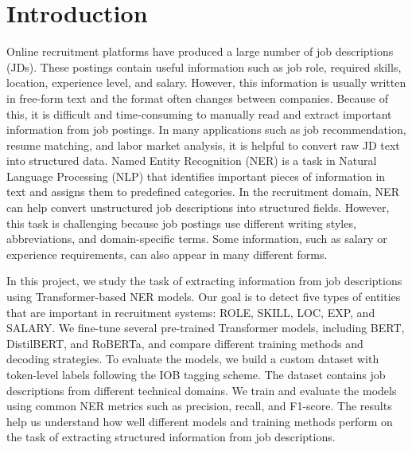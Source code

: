 \section{Introduction}

Online recruitment platforms have produced a large number of job descriptions (JDs). These postings contain useful information such as job role, required skills, location, experience level, and salary. However, this information is usually written in free-form text and the format often changes between companies. Because of this, it is difficult and time-consuming to manually read and extract important information from job postings. In many applications such as job recommendation, resume matching, and labor market analysis, it is helpful to convert raw JD text into structured data. Named Entity Recognition (NER) is a task in Natural Language Processing (NLP) that identifies important pieces of information in text and assigns them to predefined categories. In the recruitment domain, NER can help convert unstructured job descriptions into structured fields. However, this task is challenging because job postings use different writing styles, abbreviations, and domain-specific terms. Some information, such as salary or experience requirements, can also appear in many different forms.

In this project, we study the task of extracting information from job descriptions using Transformer-based NER models. Our goal is to detect five types of entities that are important in recruitment systems: ROLE, SKILL, LOC, EXP, and SALARY. We fine-tune several pre-trained Transformer models, including BERT, DistilBERT, and RoBERTa, and compare different training methods and decoding strategies. To evaluate the models, we build a custom dataset with token-level labels following the IOB tagging scheme. The dataset contains job descriptions from different technical domains. We train and evaluate the models using common NER metrics such as precision, recall, and F1-score. The results help us understand how well different models and training methods perform on the task of extracting structured information from job descriptions.